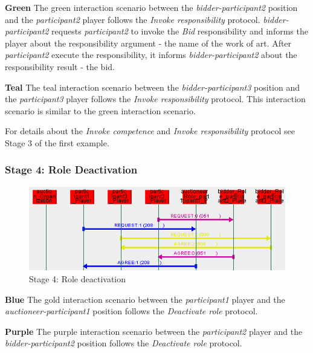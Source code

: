 \textbf{Green} The green interaction scenario between the \textit{bidder-participant2} position and the \textit{participant2} player follows the \textit{Invoke responsibility} protocol.
\textit{bidder-participant2} requests \textit{participant2} to invoke the \textit{Bid} responsibility and informs the player about the responsibility argument - the name of the work of art.
After \textit{participant2} execute the responsibility, it informs \textit{bidder-participant2} about the responsibility result - the bid.

\textbf{Teal} The teal interaction scenario between the \textit{bidder-participant3} position and the \textit{participant3} player follows the \textit{Invoke responsibility} protocol.
This interaction scenario is similar to the green interaction scenario.

For details about the \textit{Invoke competence} and \textit{Invoke responsibility} protocol see Stage 3 of the first example.

\subsubsection*{Stage 4: Role Deactivation}

\begin{figure}[H]
	\centering
	\includegraphics[width=\textwidth]{images/example3-stage4.png}
	\caption{Stage 4: Role deactivation}
	\label{figure:example3-stage4}
\end{figure}

\textbf{Blue} The gold interaction scenario between the \textit{participant1} player and the \textit{auctioneer-participant1} position follows the \textit{Deactivate role} protocol.

\textbf{Purple} The purple interaction scenario between the \textit{participant2} player and the \textit{bidder-participant2} position follows the \textit{Deactivate role} protocol.

